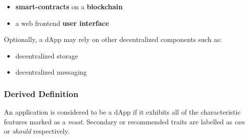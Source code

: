 \begin{itemize}
  \item \textbf{smart-contracts} on a \textbf{blockchain}
  \item a web frontend \textbf{user interface}
\end{itemize}

Optionally, a \ac{dApp} may rely on other decentralized components such as:

\begin{itemize}
  \item decentralized storage
  \item decentralized messaging
\end{itemize}



\subsubsection{Derived Definition}
An application is considered to be a \acf{dApp} if it exhibits all of the characteristic features marked as a \textit{must}. Secondary or recommended traits are labelled as \textit{can} or \textit{should} respectively.

